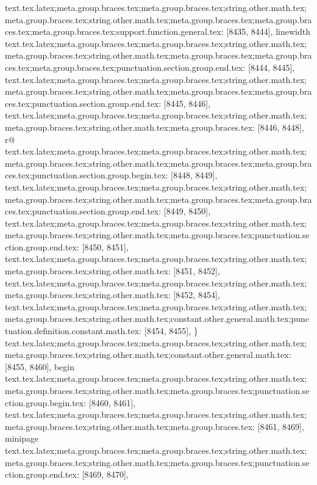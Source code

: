 {{{{{{{{{{{{{{{{{{{{{{{{{{{{{{{{{{{{{{{{{{{{{{{{{{{{{{{{{{{{{{{{{{{{{{{{{{{{{{{{{{{{{{{{{{{{{{{{{{{{{{{{{{{{{{{{{{{{{{{{{{{{{{{{{{{{{{{{{{{{{{{{{{{{{{{{{{{{{{{{{{{{{{{{{{{{{{{{{{{{{{{{{{{{{{{{{{{{{{{{{{{{{{{{{{{{{{{{{{{{{{{{{{{{{{{{{{{{{{{{{{{{{{{{{text.tex.latex;meta.group.braces.tex;meta.group.braces.tex;string.other.math.tex;meta.group.braces.tex;string.other.math.tex;meta.group.braces.tex;meta.group.braces.tex;meta.group.braces.tex;support.function.general.tex: [8435, 8444], {linewidth}
text.tex.latex;meta.group.braces.tex;meta.group.braces.tex;string.other.math.tex;meta.group.braces.tex;string.other.math.tex;meta.group.braces.tex;meta.group.braces.tex;meta.group.braces.tex;punctuation.section.group.end.tex: [8444, 8445], {}}
text.tex.latex;meta.group.braces.tex;meta.group.braces.tex;string.other.math.tex;meta.group.braces.tex;string.other.math.tex;meta.group.braces.tex;meta.group.braces.tex;punctuation.section.group.end.tex: [8445, 8446], {}}
text.tex.latex;meta.group.braces.tex;meta.group.braces.tex;string.other.math.tex;meta.group.braces.tex;string.other.math.tex;meta.group.braces.tex: [8446, 8448], {r@}
text.tex.latex;meta.group.braces.tex;meta.group.braces.tex;string.other.math.tex;meta.group.braces.tex;string.other.math.tex;meta.group.braces.tex;meta.group.braces.tex;punctuation.section.group.begin.tex: [8448, 8449], {{}
text.tex.latex;meta.group.braces.tex;meta.group.braces.tex;string.other.math.tex;meta.group.braces.tex;string.other.math.tex;meta.group.braces.tex;meta.group.braces.tex;punctuation.section.group.end.tex: [8449, 8450], {}}
text.tex.latex;meta.group.braces.tex;meta.group.braces.tex;string.other.math.tex;meta.group.braces.tex;string.other.math.tex;meta.group.braces.tex;punctuation.section.group.end.tex: [8450, 8451], {}}
text.tex.latex;meta.group.braces.tex;meta.group.braces.tex;string.other.math.tex;meta.group.braces.tex;string.other.math.tex: [8451, 8452], {
}
text.tex.latex;meta.group.braces.tex;meta.group.braces.tex;string.other.math.tex;meta.group.braces.tex;string.other.math.tex: [8452, 8454], {  }
text.tex.latex;meta.group.braces.tex;meta.group.braces.tex;string.other.math.tex;meta.group.braces.tex;string.other.math.tex;constant.other.general.math.tex;punctuation.definition.constant.math.tex: [8454, 8455], {\}
text.tex.latex;meta.group.braces.tex;meta.group.braces.tex;string.other.math.tex;meta.group.braces.tex;string.other.math.tex;constant.other.general.math.tex: [8455, 8460], {begin}
text.tex.latex;meta.group.braces.tex;meta.group.braces.tex;string.other.math.tex;meta.group.braces.tex;string.other.math.tex;meta.group.braces.tex;punctuation.section.group.begin.tex: [8460, 8461], {{}
text.tex.latex;meta.group.braces.tex;meta.group.braces.tex;string.other.math.tex;meta.group.braces.tex;string.other.math.tex;meta.group.braces.tex: [8461, 8469], {minipage}
text.tex.latex;meta.group.braces.tex;meta.group.braces.tex;string.other.math.tex;meta.group.braces.tex;string.other.math.tex;meta.group.braces.tex;punctuation.section.group.end.tex: [8469, 8470], {}}
}}}}}}}}}}}}}}}}}}}}}}}}}}}}}}}}}}}}}}}}}}}}}}}}}}}}}}}}}}}}}}}}}}}}}}}}}}}}}}}}}}}}}}}}}}}}}}}}}}}}}}}}}}}}}}}}}}}}}}}}}}}}}}}}}}}}}}}}}}}}}}}}}}}}}}}}}}}}}}}}}}}}}}}}}}}}}}}}}}}}}}}}}}}}}}}}}}}}}}}}}}}}}}}}}}}}}}}}}}}}}}}}}}}}}}}}}}}}}}}}}}}}}}}
